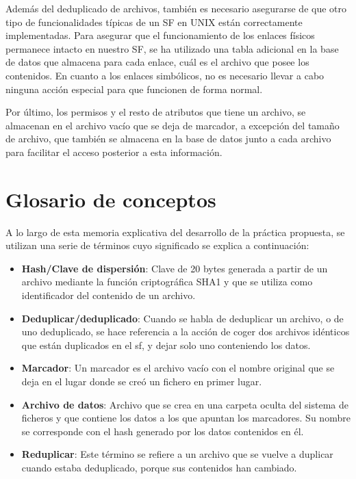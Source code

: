 \documentclass[12pt,a4paper]{article}
\begin{document}
Además del deduplicado de archivos, también es necesario asegurarse de que otro tipo de funcionalidades típicas de un SF en UNIX están correctamente implementadas. Para asegurar que el funcionamiento de los enlaces físicos permanece intacto en nuestro SF, se ha utilizado una tabla adicional en la base de datos que almacena para cada enlace, cuál es el archivo que posee los contenidos. En cuanto a los enlaces simbólicos, no es necesario llevar a cabo ninguna acción especial para que funcionen de forma normal.

Por último, los permisos y el resto de atributos que tiene un archivo, se almacenan en el archivo vacío que se deja de marcador, a excepción del tamaño de archivo, que también se almacena en la base de datos junto a cada archivo para facilitar el acceso posterior a esta información.

\newpage
\section{Glosario de conceptos}

A lo largo de esta memoria explicativa del desarrollo de la práctica propuesta, se utilizan una serie de términos cuyo significado se explica a continuación:
\begin{itemize}
 \item \textbf{Hash/Clave de dispersión}: Clave de 20 bytes generada a partir de un archivo mediante la función criptográfica SHA1 y que se utiliza como identificador del contenido de un archivo.
 \item \textbf{Deduplicar/deduplicado}: Cuando se habla de deduplicar un archivo, o de uno deduplicado, se hace referencia a la acción de coger dos archivos idénticos que están duplicados en el sf, y dejar solo uno conteniendo los datos.
 \item \textbf{Marcador}: Un marcador es el archivo vacío con el nombre original que se deja en el lugar donde se creó un fichero en primer lugar.
 \item \textbf{Archivo de datos}: Archivo que se crea en una carpeta oculta del sistema de ficheros y que contiene los datos a los que apuntan los marcadores. Su nombre se corresponde con el hash generado por los datos contenidos en él.
 \item \textbf{Reduplicar}: Este término se refiere a un archivo que se vuelve a duplicar cuando estaba deduplicado, porque sus contenidos han cambiado.
\end{itemize}
\end{document}
